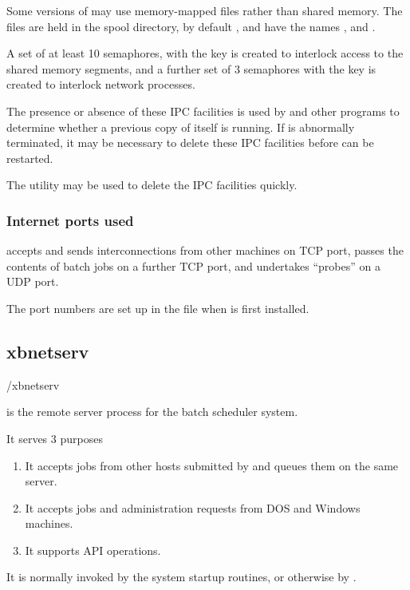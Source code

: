 Some versions of  may use memory-mapped files rather than shared memory.
The files are held in the spool directory, by default \spooldir, and have the names ,
 and .

A set of at least 10 semaphores, with the key  is created to interlock access to the
shared memory segments, and a further set of 3 semaphores with the key  is created to interlock network
processes.

The presence or absence of these IPC facilities is used by  and other programs to determine whether
a previous copy of itself is running. If  is abnormally terminated, it may be necessary to delete these IPC
facilities before  can be restarted.

The utility \PrXbRipc{} may be used to delete the IPC facilities quickly.

\subsubsection{Internet ports used}
 accepts and sends interconnections from other machines on TCP port, passes the contents of batch jobs on a
further TCP port, and undertakes ``probes'' on a UDP port.

The port numbers are set up in the  file when \ProductName{} is first installed.

\subsection{xbnetserv}

\begin{expara}

\progsdirname/xbnetserv

\end{expara}

 is the remote server process for the \ProductName{} batch scheduler system.

It serves 3 purposes

\begin{enumerate}
\item It accepts jobs from other hosts submitted by \PrRbtr{} and queues them on the same server.
\item It accepts jobs and administration requests from DOS and Windows machines.
\item It supports API operations.
\end{enumerate}
It is normally invoked by the system startup routines, or otherwise by \PrBtstart{}.

